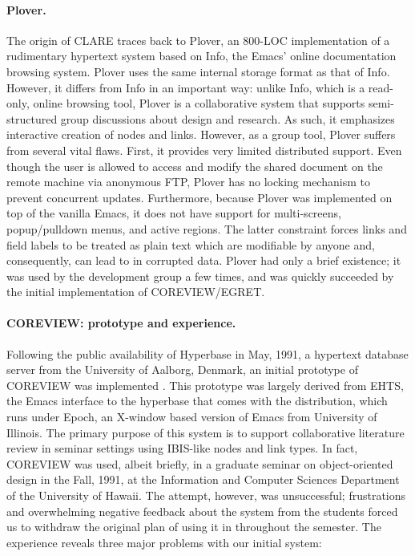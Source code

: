 \paragraph{Plover.}
\label{sec:plover}

The origin of CLARE traces back to {\sf Plover\/}, an 800-LOC
implementation of a rudimentary hypertext system based on {\sf Info\/}, the
Emacs' online documentation browsing system. Plover uses the same internal
storage format as that of Info. However, it differs from Info in an
important way: unlike Info, which is a read-only, online browsing tool,
Plover is a collaborative system that supports semi-structured group
discussions about design and research. As such, it emphasizes interactive
creation of nodes and links. However, as a group tool, Plover suffers from
several vital flaws. First, it provides very limited distributed support.
Even though the user is allowed to access and modify the shared document on
the remote machine via anonymous FTP, Plover has no locking mechanism to
prevent concurrent updates.  Furthermore, because Plover was implemented on
top of the vanilla Emacs, it does not have support for multi-screens,
popup/pulldown menus, and active regions.  The latter constraint forces
links and field labels to be treated as plain text which are modifiable by
anyone and, consequently, can lead to in corrupted data.  Plover had only a
brief existence; it was used by the development group a few times, and was
quickly succeeded by the initial implementation of COREVIEW/EGRET.


\paragraph{COREVIEW: prototype and experience.}
\label{sec:coreview}

Following the public availability of Hyperbase in May, 1991, a hypertext
database server from the University of Aalborg, Denmark, an initial
prototype of COREVIEW was implemented \cite{csdl-92-03}. This prototype was
largely derived from EHTS, the Emacs interface to the hyperbase that comes
with the distribution, which runs under Epoch, an X-window based version of
Emacs from University of Illinois. The primary purpose of this system is to
support collaborative literature review in seminar settings using IBIS-like
nodes and link types. In fact, COREVIEW was used, albeit briefly, in a
graduate seminar on object-oriented design in the Fall, 1991, at the
Information and Computer Sciences Department of the University of Hawaii.
The attempt, however, was unsuccessful; frustrations and overwhelming
negative feedback about the system from the students forced us to withdraw
the original plan of using it in throughout the semester. The experience
reveals three major problems with our initial system:


